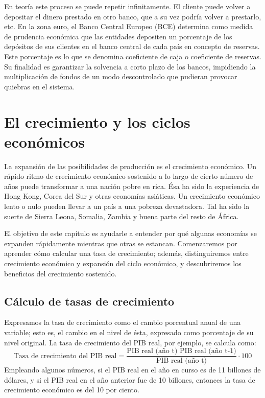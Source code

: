 \documentclass[
]{krantz}
\begin{document}
En teoría este proceso se puede repetir infinitamente. El cliente puede volver a depositar el dinero prestado en otro banco, que a su vez podría volver a prestarlo, etc. En la zona euro, el Banco Central Europeo (BCE) determina como medida de prudencia económica que las entidades depositen un porcentaje de los depósitos de sus clientes en el banco central de cada país en concepto de reservas. Este porcentaje es lo que se denomina coeficiente de caja o coeficiente de reservas. Su finalidad es garantizar la solvencia a corto plazo de los bancos, impidiendo la multiplicación de fondos de un modo descontrolado que pudieran provocar quiebras en el sistema.

\hypertarget{el-crecimiento-y-los-ciclos-econuxf3micos}{%
\chapter{El crecimiento y los ciclos económicos}\label{el-crecimiento-y-los-ciclos-econuxf3micos}}

La expansión de las posibilidades de producción es el crecimiento económico. Un rápido ritmo de crecimiento económico sostenido a lo largo de cierto número de años puede transformar a una nación pobre en rica. Ésa ha sido la experiencia de Hong Kong, Corea del Sur y otras economías asiáticas. Un crecimiento económico lento o nulo pueden llevar a un país a una pobreza devastadora. Tal ha sido la suerte de Sierra Leona, Somalia, Zambia y buena parte del resto de África.

El objetivo de este capítulo es ayudarle a entender por qué algunas economías se expanden rápidamente mientras que otras se estancan. Comenzaremos por aprender cómo calcular una tasa de crecimiento; además, distinguiremos entre crecimiento económico y expansión del ciclo económico, y descubriremos los beneficios del crecimiento sostenido.

\hypertarget{cuxe1lculo-de-tasas-de-crecimiento}{%
\section{Cálculo de tasas de crecimiento}\label{cuxe1lculo-de-tasas-de-crecimiento}}

Expresamos la tasa de crecimiento como el cambio porcentual anual de una variable; esto es, el cambio en el nivel de ésta, expresado como porcentaje de su nivel original. La tasa de crecimiento del PIB real, por ejemplo, se calcula como:
\[\mathrm {\text{Tasa de crecimiento del PIB real} = \frac{\text{PIB real (año t) PIB real (año t-1)}}{\text{PIB real (año t)}}·100}\]
Empleando algunos números, si el PIB real en el año en curso es de 11 billones de dólares, y si el PIB real en el año anterior fue de 10 billones, entonces la tasa de crecimiento económico es del 10 por ciento.
\end{document}
